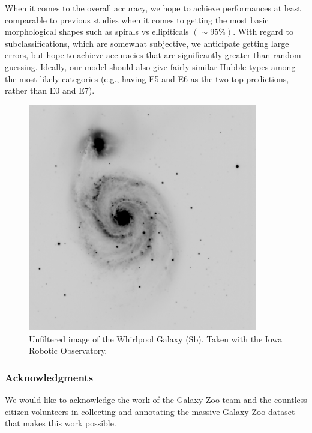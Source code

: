 \documentclass{article}
\begin{document}
When it comes to the overall accuracy, we hope to achieve performances at least comparable to previous studies when it comes to getting the most basic morphological shapes such as spirals vs ellipiticals $(\sim 95\%)$. With regard to subclassifications, which are somewhat subjective, we anticipate getting large errors, but hope to achieve accuracies that are significantly greater than random guessing. Ideally, our model should also give fairly similar Hubble types among the most likely categories (e.g., having E5 and E6 as the two top predictions, rather than E0 and E7).


\begin{figure}[h]
  \centering
	\includegraphics[width=100mm]{../img/M51.pdf}
  \caption{Unfiltered image of the Whirlpool Galaxy (Sb). Taken with the Iowa Robotic Observatory.}
  \label{fig:M51}
\end{figure}

\subsubsection*{Acknowledgments}

We would like to acknowledge the work of the Galaxy Zoo team and the countless citizen volunteers in collecting and annotating the massive Galaxy Zoo dataset that makes this work possible. 
\end{document}
